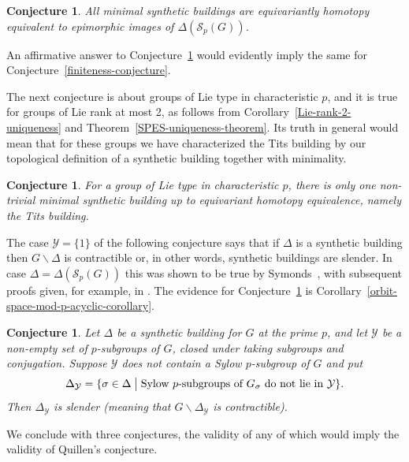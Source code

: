 \documentclass[12pt]{amsart}
\theoremstyle{plain}
\newtheorem{conjecture}[theorem]{Conjecture}
\theoremstyle{definition}
\theoremstyle{remark}
\numberwithin{equation}{section}
\def\calS{{\mathcal S}}
\def\calY{{\mathcal Y}}
\newcommand{\SpCpx}[2]{\Delta(\mathcal{S}_{#2}(#1))}
\begin{document}
\begin{conjecture}
\label{minimal-sb-are-images}
All minimal synthetic buildings are equivariantly homotopy equivalent to epimorphic images of $\SpCpx{G}{p}$.
\end{conjecture}

An affirmative answer to Conjecture~\ref{minimal-sb-are-images} would evidently imply the same for Conjecture~\ref{finiteness-conjecture}.



The next conjecture is about groups of Lie type in characteristic $p$, and it is true for groups of Lie rank at most 2, as follows from Corollary~\ref{Lie-rank-2-uniqueness} and Theorem~\ref{SPES-uniqueness-theorem}. Its truth in general would mean that for these groups we have characterized the Tits building by our topological definition of a synthetic building together with minimality.

\begin{conjecture}
\label{BN-pair-conjecture}
    For a group of Lie type in characteristic $p$, there is only one non-trivial minimal synthetic building up to equivariant homotopy equivalence, namely the Tits building.
\end{conjecture}

The case $\calY=\{1\}$ of the following conjecture says that if $\Delta$ is a synthetic building then $G\backslash\Delta$ is contractible or, in other words, synthetic buildings are slender. In case $\Delta = \Delta(\calS_p(G))$ this was shown to be true by Symonds~\cite{Sym1998}, with subsequent proofs given, for example, in \cite{Bux1999, Gro2023, Ste2023}. The evidence for Conjecture~\ref{orbit-space-contractible-conjecture} is Corollary~\ref{orbit-space-mod-p-acyclic-corollary}.

\begin{conjecture}
\label{orbit-space-contractible-conjecture}
Let $\Delta$ be a synthetic building for $G$ at the prime $p$, and let $\calY$ be a non-empty set of $p$-subgroups of $G$, closed under taking subgroups and conjugation. Suppose $\calY$ does not contain a Sylow $p$-subgroup of $G$ and put 
$$
\Delta_\calY = \{\sigma \in \Delta\bigm| \hbox{Sylow $p$-subgroups of } G_\sigma \hbox{ do not lie in } \calY\}.
$$
Then $\Delta_\calY$ is slender (meaning that $G\backslash \Delta_\calY$ is contractible).
\end{conjecture}


We conclude with three conjectures, the validity of any of which would imply the validity of Quillen's conjecture.
\end{document}
